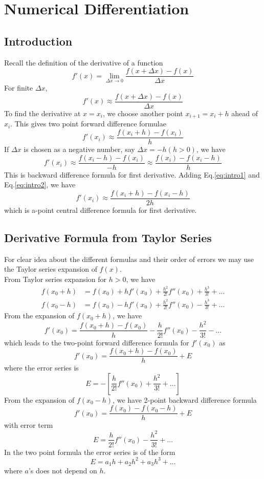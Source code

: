 \documentclass[12pt,class=book,crop=false]{standalone}
\begin{document}
\chapter{Numerical Differentiation}
\section{Introduction}
Recall the definition of the derivative of a function
\[
    f'(x)=\lim_{\Delta x\to 0}  \frac{f(x+\Delta x)-f(x)}{\Delta x}
\]
For finite $ \Delta x $,
\[
    f' (x)\approx \frac{f(x+\Delta x)-f(x)}{\Delta x}
\]
To find the derivative at $ x=x_i $, we choose another point $ x_{i+1}=x_i+h $ ahead of $ x_i $. This gives two point forward difference formulae
\begin{equation}
    \label{eq:intro1}
    f'(x_i)\approx \frac{f(x_i+h)-f(x_i)}{h}
\end{equation}
If $ \Delta x $ is chosen as a negative number, say $ \Delta x=-h  (h> 0) $, we have
\begin{equation}
    \label{eq:intro2}
    f'(x_i)\approx \frac{f(x_i-h)-f(x_i)}{-h}\approx \frac{f(x_i)-f(x_i-h)}{h}
\end{equation}
This is backward difference formula for first derivative.
Adding Eq.\eqref{eq:intro1} and Eq.\eqref{eq:intro2}, we have
\begin{equation}
    \label{eq:intro3}
    f' (x_i)\approx \frac{f(x_i+h)-f(x_i-h)}{2h}
\end{equation}
which is a-point central difference formula for first derivative.
\section{Derivative Formula from Taylor  Series}
For clear idea about the different formulas and their order of errors we may use the Taylor series expansion of $ f(x) $.\\
From Taylor series expansion for $ h > 0 $, we have
\begin{align}
    f(x_0+h) & =f(x_0)+hf'(x_0)+\frac{h^2}{2!} f''(x_0)+\frac{h^3}{3!}+\dots\label{eq:tay1}  \\
    f(x_0-h) & =f(x_0)-hf'(x_0)+\frac{h^2}{2!} f''(x_0)-\frac{h^3}{3!}+\dots \label{eq:tay2}
\end{align}
From the expansion of $ f(x_0+h) $, we have
\[
    f'(x_0)=\frac{f(x_0+h)-f(x_0)}{h}-\frac{h}{2!}f''(x_0)-\frac{h^2}{3!}-\dots
\]
which leads to the two-point forward difference formula for $ f'(x_0) $ as
\[
    f'(x_0)=\frac{f(x_0+h)-f(x_0)}{h}+E
\]
where the error series is
\[
    E=-\left[ \frac{h}{2!} f''(x_0)+\frac{h^2}{3!}+\dots  \right]
\]
From the expansion of $ f(x_0-h) $, we have 2-point backward difference formula
\[
    f'(x_0)=\frac{f(x_0)-f(x_0-h)}{h}+E
\]
with error term
\[
    E=\frac{h}{2!}f''(x_0)-\frac{h^2}{3!}+\dots
\]
In the two point formula the error series is of the form
\[
    E=a_1 h+a_2h^2+a_3h^3+\dots
\]
where $ a $'s does not depend on $ h $.\\
\end{document}
